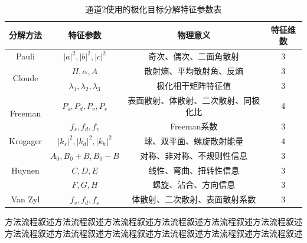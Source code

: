 \begin{table}[ht!]
  \caption{通道2使用的极化目标分解特征参数表}
  \label{tab:decomposition_features}
  \centering
  \begin{tabular}{cccc}
    \toprule[1.5bp]
    分解方法                     & 特征参数                                                             & 物理意义               & 特征维数 \\
    \midrule[0.75bp]
    Pauli                    & $\left| a \right|^2,\left| b \right|^2,\left| c \right|^2$
                             & 奇次、偶次、二面角散射                                                      & 3                         \\
    \multirow{2}{*}{Cloude}  & $H,\alpha,A$                                                     & 散射熵、平均散射角、反熵       & 3    \\
                             & $\lambda_1,\lambda_2,\lambda_3$                                  & 极化相干矩阵特征值          & 3    \\
    \multirow{2}{*}{Freeman} & $P_s,P_d,P_v,P_r$                                                & 表面散射、体散射、二次散射、同极化比 & 4    \\
                             & $f_s,f_d,f_v$                                                    & Freeman系数          & 3    \\
    Krogager                 & $\left| k_s \right|^2,\left| k_d \right|^2,\left| k_h \right|^2$ & 球、双平面、螺旋散射能量       & 4    \\
    \multirow{3}{*}{Huynen}  & $A_0,B_0+B,B_0-B$                                                & 对称、非对称、不规则性信息      & 3    \\
                             & $C,D,E$                                                          & 线性、弯曲、扭转性信息        & 3    \\
                             & $F,G,H$                                                          & 螺旋、沾合、方向信息         & 3    \\
    Van Zyl                  & $f_v,f_d,f_s$                                                    & 体散射、二次散射、表面散射系数    & 3    \\
    \bottomrule[1.5bp]
  \end{tabular}
\end{table}

方法流程叙述方法流程叙述方法流程叙述方法流程叙述方法流程叙述方法流程叙述方法流程叙述方法流程叙述方法流程叙述方法流程叙述方法流程叙述方法流程叙述

